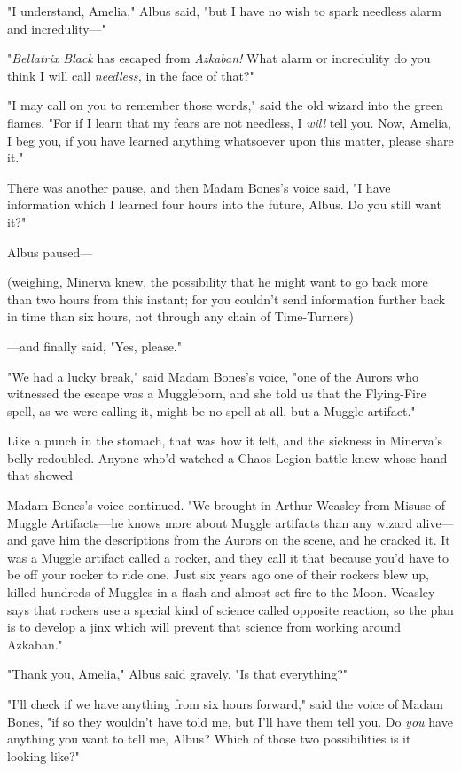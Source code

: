 "I understand, Amelia," Albus said, "but I have no wish to spark needless alarm
and incredulity\mbox{---}"

"\emph{Bellatrix Black} has escaped from \emph{Azkaban!} What alarm or
incredulity do you think I will call \emph{needless,} in the face of that?"

"I may call on you to remember those words," said the old wizard into the green
flames. "For if I learn that my fears are not needless, I \emph{will} tell you.
Now, Amelia, I beg you, if you have learned anything whatsoever upon this
matter, please share it."

There was another pause, and then Madam Bones's voice said, "I have information
which I learned four hours into the future, Albus. Do you still want it?"

Albus paused\mbox{---}

(weighing, Minerva knew, the possibility that he might want to go back more
than two hours from this instant; for you couldn't send information further
back in time than six hours, not through any chain of Time-Turners)

---and finally said, "Yes, please."

"We had a lucky break," said Madam Bones's voice, "one of the Aurors who
witnessed the escape was a Muggleborn, and she told us that the Flying-Fire
spell, as we were calling it, might be no spell at all, but a Muggle artifact."

Like a punch in the stomach, that was how it felt, and the sickness in
Minerva's belly redoubled. Anyone who'd watched a Chaos Legion battle knew
whose hand that showed{\el}

Madam Bones's voice continued. "We brought in Arthur Weasley from Misuse of
Muggle Artifacts---he knows more about Muggle artifacts than any wizard
alive---and gave him the descriptions from the Aurors on the scene, and he
cracked it. It was a Muggle artifact called a rocker, and they call it that
because you'd have to be off your rocker to ride one. Just six years ago one of
their rockers blew up, killed hundreds of Muggles in a flash and almost set
fire to the Moon. Weasley says that rockers use a special kind of science
called opposite reaction, so the plan is to develop a jinx which will prevent
that science from working around Azkaban."

"Thank you, Amelia," Albus said gravely. "Is that everything?"

"I'll check if we have anything from six hours forward," said the voice of
Madam Bones, "if so they wouldn't have told me, but I'll have them tell you. Do
\emph{you} have anything you want to tell me, Albus? Which of those two
possibilities is it looking like?"


